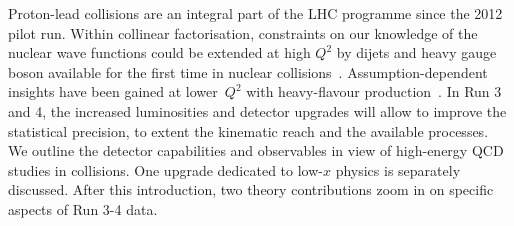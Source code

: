 \documentclass[../report.tex]{subfiles}
\begin{document}
Proton-lead  collisions are an integral part of the LHC programme since the 2012 pilot run. Within collinear factorisation, constraints on our knowledge of the nuclear wave functions could be extended at high $Q^2$ by dijets and heavy gauge boson available for the first time in nuclear collisions~\cite{Eskola:2016oht}. Assumption-dependent insights have been gained at lower~$Q^2$ with heavy-flavour production~\cite{Kusina:2017gkz}.  In Run 3 and 4, the increased luminosities and detector upgrades  will allow to improve  the statistical precision, to extent the kinematic reach and the available processes. %
We outline the detector capabilities and observables in view of high-energy QCD studies in \pPb collisions. One upgrade dedicated to low-$x$ physics is separately discussed. After this introduction, two theory contributions zoom in on specific aspects of Run 3-4 data.  
\end{document}
